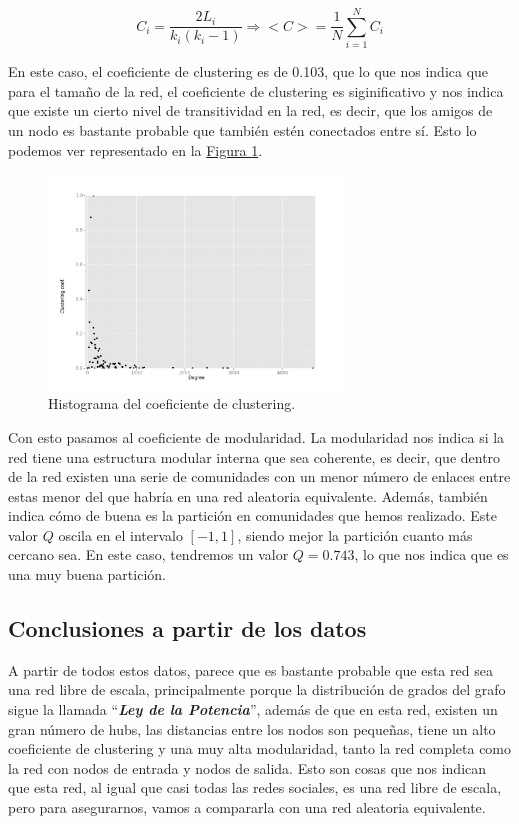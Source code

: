 \documentclass[paper=a4, fontsize=11pt]{article} %
\numberwithin{equation}{section} %
\numberwithin{figure}{section} %
\numberwithin{table}{section} %
\begin{document}
\begin{displaymath}
    C_i = \frac{2L_i}{k_i(k_i - 1)} \Longrightarrow <C> = \frac{1}{N}\sum_{i=1}^NC_i
\end{displaymath}

En este caso, el coeficiente de clustering es de 0.103, que lo que nos indica que para el tamaño de la red, el coeficiente de clustering es siginificativo y nos indica que existe un cierto nivel de transitividad en la red, es decir, que los amigos de un nodo es bastante probable que también estén conectados entre sí. Esto lo podemos ver representado en la \hyperref[im3]{Figura \ref*{im3}}.

\begin{figure}[H]
  \centering
  \includegraphics[width=0.7\textwidth]{clust_hist}
  \caption{Histograma del coeficiente de clustering.}
  \label{im3}
\end{figure}

Con esto pasamos al coeficiente de modularidad. La modularidad nos indica si la red tiene una estructura modular interna que sea coherente, es decir, que dentro de la red existen una serie de comunidades con un menor número de enlaces entre estas menor del que habría en una red aleatoria equivalente. Además, también indica cómo de buena es la partición en comunidades que hemos realizado. Este valor $Q$ oscila en el intervalo $[-1,1]$, siendo mejor la partición cuanto más cercano sea. En este caso, tendremos un valor $Q = 0.743$, lo que nos indica que es una muy buena partición.

\subsection{Conclusiones a partir de los datos}

A partir de todos estos datos, parece que es bastante probable que esta red sea una red libre de escala, principalmente porque la distribución de grados del grafo sigue la llamada ``\textbf{\textit{Ley de la Potencia}}'', además de que en esta red, existen un gran número de hubs, las distancias entre los nodos son pequeñas, tiene un alto coeficiente de clustering y una muy alta modularidad, tanto la red completa como la red con nodos de entrada y nodos de salida. Esto son cosas que nos indican que esta red, al igual que casi todas las redes sociales, es una red libre de escala, pero para asegurarnos, vamos a compararla con una red aleatoria equivalente.
\end{document}
